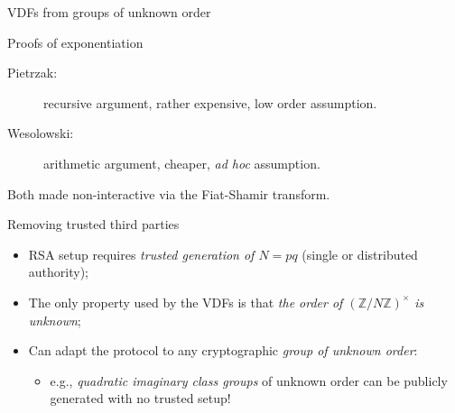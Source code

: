 \documentclass[aspectratio=169]{beamer}
\newcommand{\Z}{\mathbb{Z}}
\begin{document}
\begin{frame}[label=current]{VDFs from groups of unknown order}
  \begin{block}{Proofs of exponentiation}
    \begin{description}
    \item[Pietrzak:] recursive argument, rather expensive, low order
      assumption.
   \item[Wesolowski:] arithmetic argument, cheaper, \textit{ad hoc}
      assumption.
    \end{description}
    
    Both made non-interactive via the Fiat-Shamir transform.
  \end{block}

  \pause
  
  \begin{block}{Removing trusted third parties}
    \begin{itemize}
    \item RSA setup requires \emph{trusted generation of $N=pq$}
      (single or distributed authority);
    \item The only property used by the VDFs is that \emph{the order
        of $(\Z/N\Z)^\times$ is unknown};
    \item Can adapt the protocol to any cryptographic \emph{group of
        unknown order}:
      \begin{itemize}
      \item e.g., \emph{quadratic imaginary class groups} of unknown
        order can be publicly generated with no trusted setup!
      \end{itemize}
    \end{itemize}
  \end{block}
\end{frame}

\end{document}
